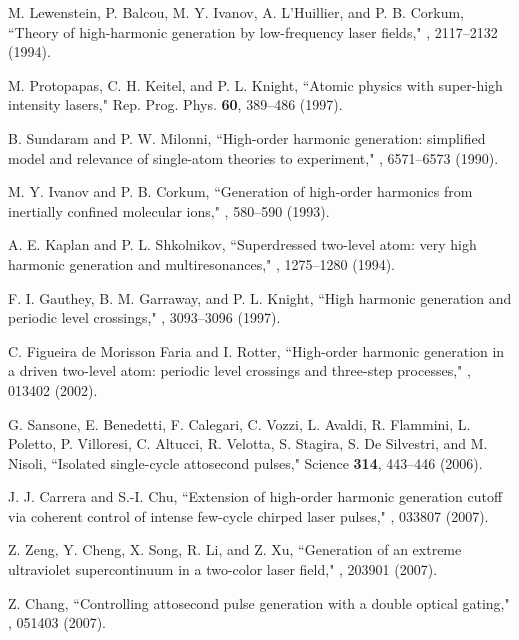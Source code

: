 \documentclass[10pt,letterpaper]{article}
\begin{document}
\begin{thebibliography}{99}
M. Lewenstein, P. Balcou, M. Y. Ivanov, A. L'Huillier, and P. B. Corkum, ``Theory of high-harmonic generation by low-frequency laser fields," , 2117--2132 (1994).

M. Protopapas, C. H. Keitel, and P. L. Knight, ``Atomic physics with super-high intensity lasers," Rep. Prog. Phys. {\bf 60}, 389--486 (1997).

B. Sundaram and P. W. Milonni, ``High-order harmonic generation: simplified model and relevance of single-atom theories to experiment," , 6571--6573 (1990).

M. Y. Ivanov and P. B. Corkum, ``Generation of high-order harmonics from inertially confined molecular ions," , 580--590 (1993).

A. E. Kaplan and P. L. Shkolnikov, ``Superdressed two-level atom: very high harmonic generation and multiresonances," , 1275--1280 (1994).

F. I. Gauthey, B. M. Garraway, and P. L. Knight, ``High harmonic generation and periodic level crossings," , 3093--3096 (1997).

C. Figueira de Morisson Faria and I. Rotter, ``High-order harmonic generation in a driven two-level atom: periodic level crossings and three-step processes," , 013402 (2002).

G. Sansone, E. Benedetti, F. Calegari, C. Vozzi, L. Avaldi, R. Flammini, L. Poletto, P. Villoresi, C. Altucci, R. Velotta, S. Stagira, S. De Silvestri, and M. Nisoli, ``Isolated single-cycle attosecond pulses," Science {\bf 314}, 443--446 (2006).

J. J. Carrera and S.-I. Chu, ``Extension of high-order harmonic generation cutoff via coherent control of intense few-cycle chirped laser pulses," , 033807 (2007).

Z. Zeng, Y. Cheng, X. Song, R. Li, and Z. Xu, ``Generation of an extreme ultraviolet supercontinuum in a two-color laser field," , 203901 (2007).

Z. Chang, ``Controlling attosecond pulse generation with a double optical gating," , 051403 (2007).


\end{thebibliography}
\end{document}
